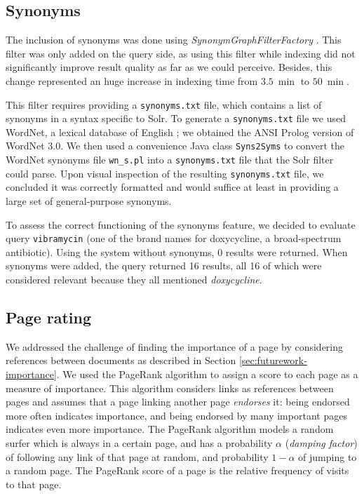 \documentclass[sigconf, authorversion]{acmart}
\begin{document}
\subsection{Synonyms}

The inclusion of synonyms was done using \textit{SynonymGraphFilterFactory} \cite{synonym-graph-filter-factory}. This filter was only added on the query side, as using this filter while indexing did not significantly improve result quality as far as we could perceive. Besides, this change represented an huge increase in indexing time from $\SI{3.5}{\min}$ to $\SI{50}{\min}$.

This filter requires providing a \texttt{synonyms.txt} file, which contains a list of synonyms in a syntax specific to Solr. To generate a \texttt{synonyms.txt} file we used WordNet, a lexical database of English \cite{wordnet}; we obtained the ANSI Prolog version of WordNet 3.0. We then used a convenience Java class \texttt{Syns2Syms} \cite{syns2syms} to convert the WordNet synonyms file \texttt{wn\_s.pl} into a \texttt{synonyms.txt} file that the Solr filter could parse. Upon visual inspection of the resulting \texttt{synonyms.txt} file, we concluded it was correctly formatted and would suffice at least in providing a large set of general-purpose synonyms.

To assess the correct functioning of the synonyms feature, we decided to evaluate query \texttt{vibramycin} (one of the brand names for doxycycline, a broad-spectrum antibiotic). Using the system without synonyms, 0 results were returned. When synonyms were added, the query returned 16 results, all 16 of which were considered relevant because they all mentioned \textit{doxycycline}.



\subsection{Page rating}

We addressed the challenge of finding the importance of a page by considering references between documents as described in Section \ref{sec:futurework-importance}. We used the PageRank algorithm \cite{pagerank} to assign a score to each page as a measure of importance. This algorithm considers links as references between pages and assumes that a page linking another page \textit{endorses} it: being endorsed more often indicates importance, and being endorsed by many important pages indicates even more importance. The PageRank algorithm models a random surfer which is always in a certain page, and has a probability $\alpha$ (\textit{damping factor}) of following any link of that page at random, and probability $1-\alpha$ of jumping to a random page. The PageRank score of a page is the relative frequency of visits to that page.
\end{document}
